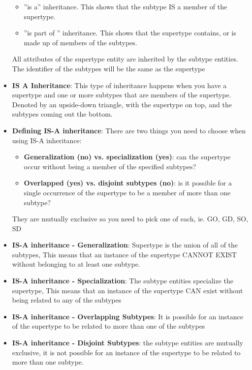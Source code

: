 \documentclass{report}
\begin{document}
\begin{itemize}
            \begin{itemize}
                \item ”is a” inheritance. This shows that the subtype IS a member of the supertype.
                \item ”is part of ” inheritance. This shows that the supertype contains, or is made up of members of the subtypes.
            \end{itemize}
            \bigbreak \noindent 
            All attributes of the supertype entity are inherited by the subtype entities. The identifier of the subtypes will be the same as the supertype
            \bigbreak \noindent 
        \item \textbf{IS A Inheritance}:  This type of inheritance happens when you have a supertype and one or more subtypes that are members
            of the supertype. Denoted by an upside-down triangle, with the supertype on top, and the subtypes coming out the bottom.
            \bigbreak \noindent 
        \item \textbf{Defining IS-A inheritance}: There are two things you need to choose when using IS-A inheritance:
            \begin{itemize}
                \item \textbf{Generalization (no) vs. specialization (yes)}: can the supertype occur without being a member of the specified subtypes?
                \item \textbf{Overlapped (yes) vs. disjoint subtypes (no)}: is it possible for a single occurrence of the supertype to be a member of more than one subtype?
            \end{itemize}
            \bigbreak \noindent 
            They are mutually exclusive so you need to pick one of each, ie. GO, GD, SO, SD
        \item \textbf{IS-A inheritance - Generalization}:  Supertype is the union of all of the subtypes, This means that an instance of the supertype CANNOT EXIST without belonging to at least one subtype.
        \item \textbf{IS-A inheritance - Specialization}: The subtype entities specialize the supertype, This means that an instance of the supertype CAN exist without being related to any of the subtypes
        \item \textbf{IS-A inheritance - Overlapping Subtypes}: It is possible for an instance of the supertype to be related to more than one of the subtypes
        \item \textbf{IS-A inheritance - Disjoint Subtypes}: the subtype entities are mutually exclusive, it is not possible for an instance of the supertype to be related to more than one subtype.

\end{itemize}
\end{document}
